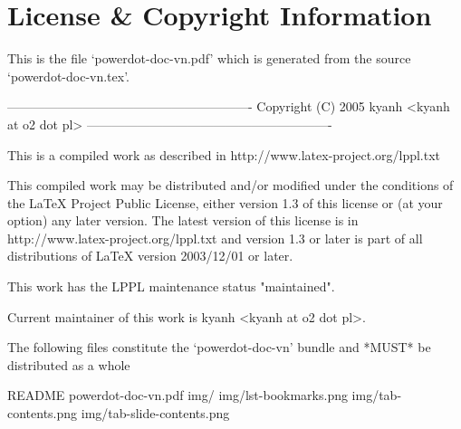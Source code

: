 \section*{License \& Copyright Information}

\vspace{3cm}
\begin{example}
 This is the file `powerdot-doc-vn.pdf'
 which is generated from the source `powerdot-doc-vn.tex'.

 ----------------------------------------------------------
 Copyright (C) 2005 kyanh <kyanh at o2 dot pl>
 ----------------------------------------------------------

 This is a compiled work as described in
 	http://www.latex-project.org/lppl.txt

 This compiled work may be distributed and/or modified under the
 conditions of the LaTeX Project Public License, either version 1.3
 of this license or (at your option) any later version.
 The latest version of this license is in
	http://www.latex-project.org/lppl.txt
 and version 1.3 or later is part of all distributions of LaTeX
 version 2003/12/01 or later.

 This work has the LPPL maintenance status "maintained".

 Current maintainer of this work is kyanh <kyanh at o2 dot pl>.
 
 The following files constitute the `powerdot-doc-vn' bundle
 and *MUST* be distributed as a whole
 
  README
  powerdot-doc-vn.pdf
  img/
  img/lst-bookmarks.png
  img/tab-contents.png
  img/tab-slide-contents.png
\end{example}
\endinput
